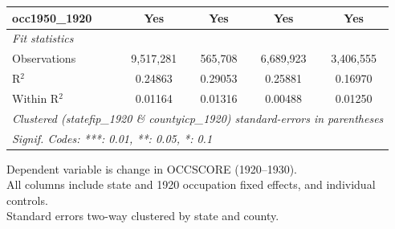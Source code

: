 \begin{table}[htbp]
\begin{tabular}{lcccc}
      occ1950\_1920        & Yes             & Yes             & Yes                     & Yes\\  
      \midrule
      \emph{Fit statistics}\\
      Observations         & 9,517,281       & 565,708         & 6,689,923               & 3,406,555\\  
      R$^2$                & 0.24863         & 0.29053         & 0.25881                 & 0.16970\\  
      Within R$^2$         & 0.01164         & 0.01316         & 0.00488                 & 0.01250\\  
      \midrule \midrule
      \multicolumn{5}{l}{\emph{Clustered (statefip\_1920 \& countyicp\_1920) standard-errors in parentheses}}\\
      \multicolumn{5}{l}{\emph{Signif. Codes: ***: 0.01, **: 0.05, *: 0.1}}\\
   \end{tabular}
   
   \par \raggedright 
   Dependent variable is change in OCCSCORE (1920--1930).\\
   All columns include state and 1920 occupation fixed effects, and individual controls.\\
   Standard errors two-way clustered by state and county.
\end{table}


